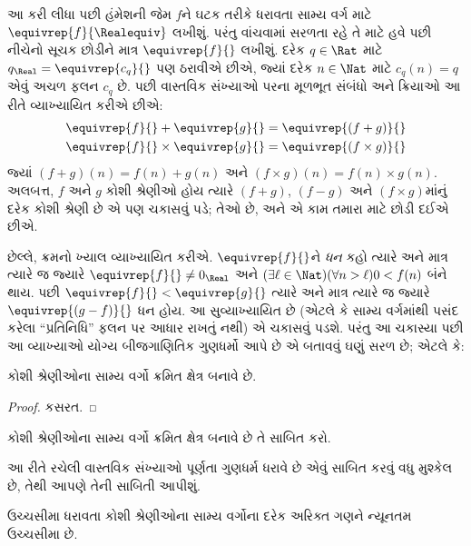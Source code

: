 આ કરી લીધા પછી હંમેશની જેમ $f$ને ઘટક તરીકે ધરાવતા સામ્ય
વર્ગ માટે $\equivrep{f}{\Realequiv}$ લખીશું. પરંતુ વાંચવામાં સરળતા
રહે તે માટે હવે પછી નીચેનો સૂચક છોડીને માત્ર $\equivrep{f}{}$ લખીશું.
દરેક $q \in \Rat$ માટે $q_{\Real} = \equivrep{c_{q}}{}$ પણ ઠરાવીએ
છીએ, જ્યાં દરેક $n \in \Nat$ માટે $c_q(n) = q$ એવું અચળ ફલન $c_{q}$
છે. પછી વાસ્તવિક સંખ્યાઓ પરના મૂળભૂત સંબંધો અને ક્રિયાઓ આ રીતે
વ્યાખ્યાયિત કરીએ છીએ:
\begin{align*}
	\equivrep{f}{} + \equivrep{g}{} &= 	\equivrep{(f + g)}{} \\
	\equivrep{f}{} \times 	\equivrep{g}{} &= \equivrep{(f \times g)}{}
\end{align*}
જ્યાં $(f + g)(n) = f(n) + g(n)$ અને $(f \times g)(n) = f(n) \times
g(n)$. અલબત્ત, $f$ અને $g$ કોશી શ્રેણીઓ હોય ત્યારે $(f + g)$,
$(f-g)$ અને $(f\times g)$માંનું દરેક કોશી શ્રેણી છે એ પણ ચકાસવું પડે;
તેઓ છે, અને એ કામ તમારા માટે છોડી દઈએ છીએ.

છેલ્લે, ક્રમનો ખ્યાલ વ્યાખ્યાયિત કરીએ. $\equivrep{f}{}$ને
\emph{ધન} કહો ત્યારે અને માત્ર ત્યારે જ જ્યારે $\equivrep{f}{}\neq
0_\Real$ અને $(\exists \ell \in \Nat)(\forall n > \ell)0 < f(n)$
બંને થાય. પછી $\equivrep{f}{} < \equivrep{g}{}$ ત્યારે અને માત્ર
ત્યારે જ જ્યારે $\equivrep{(g - f)}{}$ ધન હોય. આ સુવ્યાખ્યાયિત છે
(એટલે કે સામ્ય વર્ગમાંથી પસંદ કરેલા ``પ્રતિનિધિ'' ફલન પર આધાર
રાખતું નથી) એ ચકાસવું પડશે.
પરંતુ આ ચકાસ્યા પછી આ વ્યાખ્યાઓ યોગ્ય બીજગાણિતિક ગુણધર્મો આપે છે
એ બતાવવું ઘણું સરળ છે; એટલે કે:
\begin{thm}
કોશી શ્રેણીઓના સામ્ય વર્ગો ક્રમિત ક્ષેત્ર બનાવે છે.
\end{thm}

\begin{proof}
કસરત.
\end{proof}

\begin{prob}
કોશી શ્રેણીઓના સામ્ય વર્ગો ક્રમિત ક્ષેત્ર બનાવે છે તે સાબિત કરો.
\end{prob}

આ રીતે રચેલી વાસ્તવિક સંખ્યાઓ પૂર્ણતા ગુણધર્મ ધરાવે છે એવું સાબિત
કરવું વધુ મુશ્કેલ છે, તેથી આપણે તેની સાબિતી આપીશું.

\begin{thm}
ઉચ્ચસીમા ધરાવતા કોશી શ્રેણીઓના સામ્ય વર્ગોના દરેક અરિક્ત ગણને ન્યૂનતમ ઉચ્ચસીમા છે.
\end{thm}

